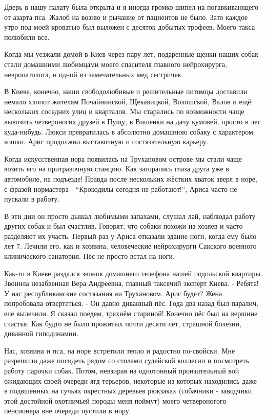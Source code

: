 Дверь в нашу палату была открыта и я иногда громко шипел на погавкивающего от
азарта пса. Жалоб на возню и рычание от пациентов не было. Зато каждое утро под
моей кроватью был выложен с десяток добытых трофеев. Моего такса полюбили все. 

Когда мы уезжали домой в Киев через пару лет, подаренные щенки наших собак
стали домашними любимцами моего спасителя главного нейрохирурга, невропатолога,
и одной из замечательных мед сестричек. 

В Киеве, конечно, наши свободолюбивые и решительные питомцы доставили немало
хлопот жителям Почайнинской, Щекавицкой, Волошской, Валов и ещё нескольких
соседних улиц и кварталов. Мы старались по возможности чаще вывозить
четвероногих друзей в Пущу, в Вишенки на дачу кумовей, просто в лес
куда-нибудь. Люкси превратилась в абсолютно домашнюю собаку с характером кошки.
Арис продолжил выставочную и состязательную карьеру.

Когда искусственная нора появилась на Трухановом острове мы стали чаще возить
его на притравочную станцию. Как загорались глаза друга уже в автомобиле, на
подъезде! Правда после нескольких жёстких хваток зверя в норе, с фразой
нормастера - \enquote{Крокодилы сегодня не работают!}, Ариса часто не пускали в работу.

В эти дни он просто дышал любимыми запахами, слушал лай, наблюдал работу других
собак и был счастлив. Говорят, что собаки похожи на хозяев и часто разделяют их
участь. Первый раз у Ариса отказали здание ноги, когда ему было лет 7. Лечили
его, как и хозяина, человеческие нейрохирурги Сакского военного клинического
санатория. Пёс не просто встал на ноги. 

Как-то в Киеве раздался звонок
домашнего телефона нашей подольской квартиры. Звонила незабвенная Вера
Андреевна, главный таксячий эксперт Киева. - Ребята! У нас республиканские
состязания на Трухановом. Арис будет? Жена попробовала отвертеться. - Он давно
диванный пёс. Года два назад был паралич, еле вылечили. Я сказал поедем,
тряхнём стариной! Конечно пёс был на вершине счастья. Как будто не было
прожитых почти десяти лет, страшной болезни, диванной гиподинамии. 

Нас, хозяина и пса, на норе встретили тепло и радостно по-свойски. Мне
разрешили даже посидеть рядом со столами судейской коллегии и посмотреть работу
парочки собак.  Потом, невзирая на однотонный пронзительный вой ожидающих своей
очереди ягд-терьеров, некоторые из которых находились даже в подвшенных на
сучьях окрестных деревьев рюкзаках (собачники - заводчики этой достойной
охотничьей породы меня поймут) моего четвероногого пенсионера вне очереди
пустили в нору.


